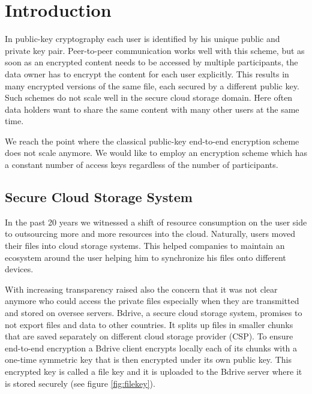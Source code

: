 \chapter{Introduction}
\label{sec:introduction}
In public-key cryptography each user is identified by his unique public and private key pair. Peer-to-peer communication works well with this scheme, but as soon as an encrypted content needs to be accessed by multiple participants, the data owner has to encrypt the content for each user explicitly. This results in many encrypted versions of the same  file, each secured by a different public key. Such schemes do not scale well in the secure cloud storage domain. Here often data holders want to share the same content with many other users at the same time.

We reach the point where the classical public-key end-to-end encryption scheme does not scale anymore. We would like to employ an encryption scheme which has a constant number of access keys regardless of the number of participants.

\section{Secure Cloud Storage System}
In the past 20 years we witnessed a shift of resource consumption on the user side to outsourcing more and more resources into the cloud. Naturally, users moved their files into cloud storage systems. This helped companies to maintain an ecosystem around the user helping him to synchronize his files onto different devices.  

With increasing transparency raised also the concern that it was not clear anymore who could access the private files especially when they are transmitted and stored on oversee servers. Bdrive, a secure cloud storage system, promises to not export files and data to other countries. It splits up files in smaller chunks that are saved separately on different cloud storage provider (\ac{CSP}). To ensure end-to-end encryption a Bdrive client encrypts locally each of its chunks with a one-time symmetric key that is then encrypted under its own public key. This encrypted key is called a file key and it is uploaded to the Bdrive server where it is stored securely (see figure \ref{fig:filekey}).

